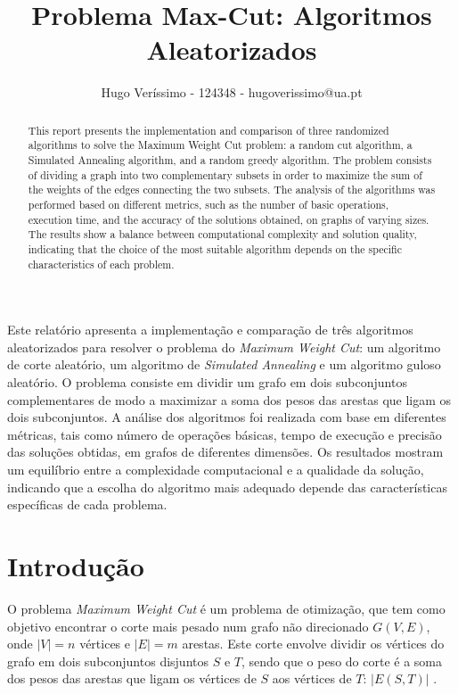 \documentclass[mirror, portugues]{revdetua}
\begin{document}

\title{Problema Max-Cut: Algoritmos Aleatorizados}
\author{Hugo Veríssimo - 124348 - hugoverissimo@ua.pt}
\maketitle

\begin{abstract}
This report presents the implementation and comparison of three randomized algorithms to solve the Maximum Weight Cut problem: a random cut algorithm, a Simulated Annealing algorithm, and a random greedy algorithm. The problem consists of dividing a graph into two complementary subsets in order to maximize the sum of the weights of the edges connecting the two subsets. The analysis of the algorithms was performed based on different metrics, such as the number of basic operations, execution time, and the accuracy of the solutions obtained, on graphs of varying sizes. The results show a balance between computational complexity and solution quality, indicating that the choice of the most suitable algorithm depends on the specific characteristics of each problem.
\end{abstract}

\begin{resumo}
Este relatório apresenta a implementação e comparação de três algoritmos aleatorizados para resolver o problema do \textit{Maximum Weight Cut}: um algoritmo de corte aleatório, um algoritmo de \textit{Simulated Annealing} e um algoritmo guloso aleatório. O problema consiste em dividir um grafo em dois subconjuntos complementares de modo a maximizar a soma dos pesos das arestas que ligam os dois subconjuntos. A análise dos algoritmos foi realizada com base em diferentes métricas, tais como número de operações básicas, tempo de execução e precisão das soluções obtidas, em grafos de diferentes dimensões. Os resultados mostram um equilíbrio entre a complexidade computacional e a qualidade da solução, indicando que a escolha do algoritmo mais adequado depende das características específicas de cada problema.
\end{resumo}





\section{Introdução}

O problema \textit{Maximum Weight Cut} é um problema de otimização, que tem como objetivo encontrar o corte mais pesado num grafo não direcionado $G(V,E)$, onde $|V| = n$ vértices e $|E| = m$ arestas. Este corte envolve dividir os vértices do grafo em dois subconjuntos disjuntos $S$ e $T$, sendo que o peso do corte é a soma dos pesos das arestas que ligam os vértices de $S$ aos vértices de $T$: $|E(S, T)|$ \cite{AG14}.
\end{document}

